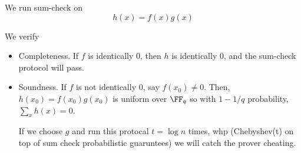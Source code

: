 \documentclass{scrartcl}
\begin{document}
\begin{sol}
\begin{enumerate}[A.]
\begin{enumerate}
            We run sum-check on 
            \[h(x) = f(x)g(x)\]

            We verify
            \begin{itemize}
                \item Completeness.
                If $f$ is identically 0, then $h$ is identically 0, and the sum-check protocol will pass.
                \item Soundness.
                If $f$ is not identically 0, say $f(x_0) \ne 0$. Then, $h(x_0) = f(x_0)g(x_0)$ is uniform over $\FF_q$ so with $1-1/q$ probability, $\sum_x h(x)=0$.

                If we choose $g$ and run this protocal $t=\log n$ times, whp (Chebyshev(t) on top of sum check probabilistic guaruntees) we will catch the prover cheating.
            \end{itemize}
        \end{enumerate}
    \end{enumerate}
\end{sol}

\setcounter{problem}{4}
\end{document}
